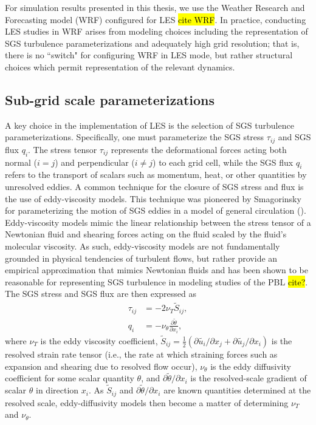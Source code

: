 For simulation results presented in this thesis, we use the Weather Research and Forecasting model (WRF) configured for LES \hl{cite WRF}. In practice, conducting LES studies in WRF arises from modeling choices including the representation of SGS turbulence parameterizations and adequately high grid resolution; that is, there is no ``switch" for configuring WRF in LES mode, but rather structural choices which permit representation of the relevant dynamics. 

\subsection{Sub-grid scale parameterizations}
A key choice in the implementation of LES is the selection of SGS turbulence parameterizations. Specifically, one must parameterize the SGS stress $\tau_{ij}$ and SGS flux $q_i$. The stress tensor $\tau_{ij}$ represents the deformational forces acting both normal ($i=j$) and perpendicular ($i\neq j$) to each grid cell, while the SGS flux $q_i$ refers to the transport of scalars such as momentum, heat, or other quantities by unresolved eddies. A common technique for the closure of SGS stress and flux is the use of eddy-viscosity models. This technique was pioneered by Smagorinsky for parameterizing the motion of SGS eddies in a model of general circulation (\cite{smagorinsky_general_1963}). Eddy-viscosity models mimic the linear relationship between the stress tensor of a Newtonian fluid and shearing forces acting on the fluid scaled by the fluid's molecular viscosity. As such, eddy-viscosity models are not fundamentally grounded in physical tendencies of turbulent flows, but rather provide an empirical approximation that mimics Newtonian fluids and has been shown to be reasonable for representing SGS turbulence in modeling studies of the PBL \hl{cite?}. The SGS stress and SGS flux are then expressed as 
\begin{align}
\tau_{ij} &= -2\nu_T \tilde{S}_{ij},\\
q_i &= -\nu_{\theta}\frac{\partial \tilde{\theta}}{\partial x_i}, 
\end{align}
where $\nu_T$ is the eddy viscosity coefficient, $\tilde{S}_{ij} = \frac{1}{2} (\partial\tilde{u_i}/\partial x_j + \partial\tilde{u_j}/\partial x_i )$ is the resolved strain rate tensor (i.e., the rate at which straining forces such as expansion and shearing due to resolved flow occur), $\nu_{\theta}$ is the eddy diffusivity coefficient for some scalar quantity $\theta$, and $\partial \tilde{\theta} / \partial x_i$ is the resolved-scale gradient of scalar $\theta$ in direction $x_i$. As $\tilde{S}_{ij}$ and $\partial \tilde{\theta} / \partial x_i$ are known quantities determined at the resolved scale, eddy-diffusivity models then become a matter of determining $\nu_T$ and $\nu_{\theta}$. 


